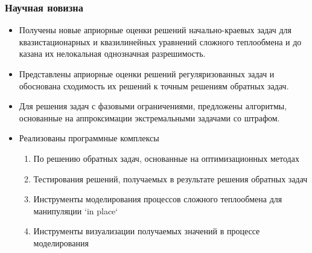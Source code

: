 \begin{frame}
    \frametitle{Научная новизна}
    \begin{itemize}
        \item Получены новые априорные оценки решений начально-краевых задач для
        квазистационарных и квазилинейных уравнений сложного теплообмена и до
        казана их нелокальная однозначная разрешимость.
        \item Представлены априорные
        оценки решений регуляризованных задач и обоснована сходимость их решений к
        точным решениям обратных задач.
        \item Для решения задач с фазовыми ограничениями,
        предложены алгоритмы, основанные на аппроксимации экстремальными
        задачами со штрафом.
        \item Реализованы программные комплексы
        \begin{enumerate}
            \item По решению обратных задач, основанные на оптимизационных методах
            \item Тестирования решений, получаемых в результате решения обратных задач
            \item Инструменты моделирования процессов сложного теплообмена для манипуляции `in place`
            \item Инструменты визуализации получаемых значений в процессе моделирования
        \end{enumerate}
    \end{itemize}
    \begin{minipage}[t]{.25\linewidth}
    \end{minipage}
    \hfill
    \begin{minipage}[t]{.25\linewidth}
    \end{minipage}
    \hfill
    \begin{minipage}[t]{.25\linewidth}
    \end{minipage}
\end{frame}




